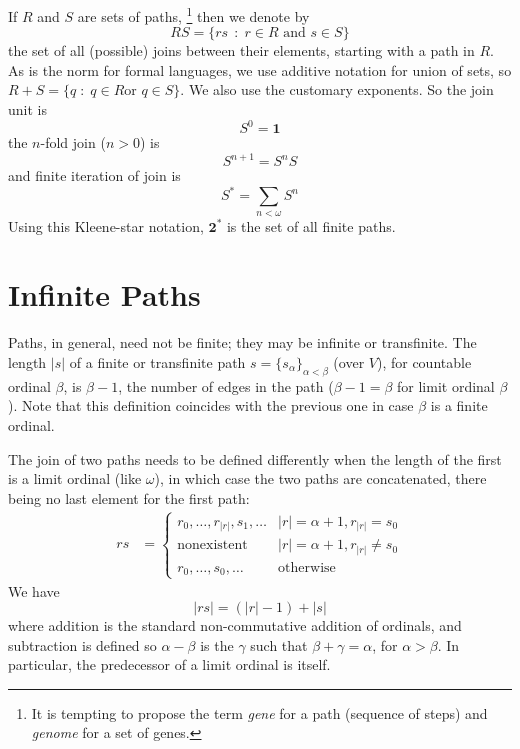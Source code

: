 \documentclass{llncs}
\newcommand{\ABC}{V}
\newcommand{\Pair}{\textbf{2}}
\newcommand{\One}{\textbf{1}}
\newcommand{\hide}[1]{}
\begin{document}
If $R$ and $S$ are sets of paths,%
\footnote{It is tempting to propose the term \emph{gene} for a path
  (sequence of steps) and \emph{genome} for a set of genes. 
  \hide{I DO NOT
  THINK SO. IN THE CASE OF GENES, THE 4 ELEMENTS ALPHABET IS NOT AN
  ALPHABET OF POINTS, BUT LABELS THE STEPS INSTEAD. AT LEAST, THAT'S 
HOW BIOLOGISTS LOOK AT IT.}} 
then we denote by
\[
RS = \{{rs}\,\;\colon\; r\in R \textrm{ and } s\in S\}
\]
the set of all (possible) joins between their elements, starting with
a path in $R$.  As is the norm for formal languages, we use additive
notation for union of sets, so $R+S = \{ q \;\colon\; q\in R \textrm{
  or } q \in S\}$.  We also use the customary exponents. So the join
unit is
\[
S^0 = \One
\]
the $n$-fold join ($n>0$) is
\[
S^{n+1} = S^{n} S
\]
and  finite iteration of join is
\[
S^\ast = \sum_{n<\omega} S^n
\]
Using this Kleene-star notation, $\Pair^\ast$ is the set of all finite paths.

\section{Infinite Paths}

Paths, in general, need not be finite; they may be infinite or
transfinite.  The length $|s|$ of a finite or transfinite path
$s=\{s_\alpha\}_{\alpha< \beta}$ (over $\ABC$), for countable ordinal
$\beta$, is $\beta-1$, the number of edges in the path
($\beta-1=\beta$ for limit ordinal $\beta$). Note that this definition
coincides with the previous one in case $\beta$ is a finite ordinal.

The join of two paths needs to be defined differently
when the length of the first is a limit ordinal (like $\omega$), in
which case the two paths are concatenated, there being no last element for the first path:
\[
\begin{array}{ll}
r s & =\begin{cases}
r_0 ,\dots, r_{|r|}, s_1, \dots & |r|=\alpha+1, r_{|r|}=s_0\\
\mbox{nonexistent}& |r|=\alpha+1, r_{|r|} \neq s_0\\
r_0, \dots , s_0, \dots  & \mbox{otherwise}
\end{cases}
\end{array}
\]
We have
\[
|rs| = (|r|-1)  + |s|
\]
where addition is the standard non-commutative addition of ordinals,
and subtraction is defined so $\alpha - \beta$ is the $\gamma$ such
that $\beta+\gamma=\alpha$, for $\alpha>\beta$. In particular, the
predecessor of a limit ordinal is itself.
\end{document}
